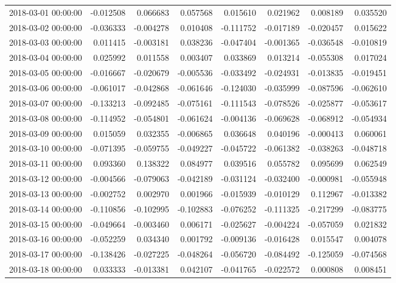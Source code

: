 \begin{tabular}{lrrrrrrr}
2018-03-01 00:00:00 & -0.012508 & 0.066683 & 0.057568 & 0.015610 & 0.021962 & 0.008189 & 0.035520 \\
2018-03-02 00:00:00 & -0.036333 & -0.004278 & 0.010408 & -0.111752 & -0.017189 & -0.020457 & 0.015622 \\
2018-03-03 00:00:00 & 0.011415 & -0.003181 & 0.038236 & -0.047404 & -0.001365 & -0.036548 & -0.010819 \\
2018-03-04 00:00:00 & 0.025992 & 0.011558 & 0.003407 & 0.033869 & 0.013214 & -0.055308 & 0.017024 \\
2018-03-05 00:00:00 & -0.016667 & -0.020679 & -0.005536 & -0.033492 & -0.024931 & -0.013835 & -0.019451 \\
2018-03-06 00:00:00 & -0.061017 & -0.042868 & -0.061646 & -0.124030 & -0.035999 & -0.087596 & -0.062610 \\
2018-03-07 00:00:00 & -0.133213 & -0.092485 & -0.075161 & -0.111543 & -0.078526 & -0.025877 & -0.053617 \\
2018-03-08 00:00:00 & -0.114952 & -0.054801 & -0.061624 & -0.004136 & -0.069628 & -0.068912 & -0.054934 \\
2018-03-09 00:00:00 & 0.015059 & 0.032355 & -0.006865 & 0.036648 & 0.040196 & -0.000413 & 0.060061 \\
2018-03-10 00:00:00 & -0.071395 & -0.059755 & -0.049227 & -0.045722 & -0.061382 & -0.038263 & -0.048718 \\
2018-03-11 00:00:00 & 0.093360 & 0.138322 & 0.084977 & 0.039516 & 0.055782 & 0.095699 & 0.062549 \\
2018-03-12 00:00:00 & -0.004566 & -0.079063 & -0.042189 & -0.031124 & -0.032400 & -0.000981 & -0.055948 \\
2018-03-13 00:00:00 & -0.002752 & 0.002970 & 0.001966 & -0.015939 & -0.010129 & 0.112967 & -0.013382 \\
2018-03-14 00:00:00 & -0.110856 & -0.102995 & -0.102883 & -0.076252 & -0.111325 & -0.217299 & -0.083775 \\
2018-03-15 00:00:00 & -0.049664 & -0.003460 & 0.006171 & -0.025627 & -0.004224 & -0.057059 & 0.021832 \\
2018-03-16 00:00:00 & -0.052259 & 0.034340 & 0.001792 & -0.009136 & -0.016428 & 0.015547 & 0.004078 \\
2018-03-17 00:00:00 & -0.138426 & -0.027225 & -0.048264 & -0.056720 & -0.084492 & -0.125059 & -0.074568 \\
2018-03-18 00:00:00 & 0.033333 & -0.013381 & 0.042107 & -0.041765 & -0.022572 & 0.000808 & 0.008451 \\

\end{tabular}
